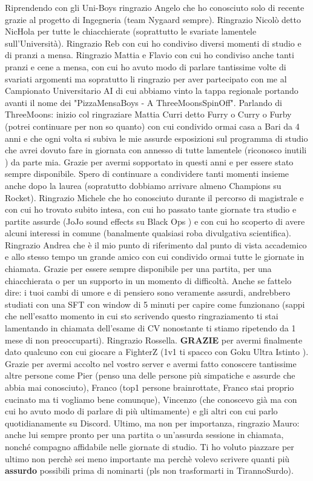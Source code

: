 Riprendendo con gli Uni-Boys ringrazio Angelo che ho conosciuto solo di recente grazie al progetto di Ingegneria (team Nygaard sempre). Ringrazio Nicolò detto NicHola per tutte le chiacchierate (soprattutto le svariate lamentele sull'Università). Ringrazio Reb con cui ho condiviso diversi momenti di studio e di pranzi a mensa. Ringrazio Mattia e Flavio con cui ho condiviso anche tanti pranzi e cene a mensa, con cui ho avuto modo di parlare tantissime volte di svariati argomenti ma sopratutto li ringrazio per aver partecipato con me al Campionato Universitario AI di cui abbiamo vinto la tappa regionale portando avanti il nome dei "PizzaMensaBoys - A ThreeMoonsSpinOff". Parlando di ThreeMoons: inizio col ringraziare Mattia Curri detto Furry o Curry o Furby (potrei continuare per non so quanto) con cui condivido ormai casa a Bari da 4 anni e che ogni volta si subiva le mie assurde esposizioni sul programma di studio che avrei dovuto fare in giornata con annesso di tutte lamentele (riconosco inutili ) da parte mia. Grazie per avermi sopportato in questi anni e per essere stato sempre disponibile. Spero di continuare a condividere tanti momenti insieme anche dopo la laurea (sopratutto dobbiamo arrivare almeno Champions su Rocket). Ringrazio Michele che ho conosciuto durante il percorso di magistrale e con cui ho trovato subito intesa, con cui ho passato tante giornate tra studio e partite assurde (JoJo sound effects su Black Ops ) e con cui ho scoperto di avere alcuni interessi in comune (banalmente qualsiasi roba divulgativa scientifica). Ringrazio Andrea che è il mio punto di riferimento dal punto di vista accademico e allo stesso tempo un grande amico con cui condivido ormai tutte le giornate in chiamata. Grazie per essere sempre disponibile per una partita, per una chiacchierata o per un supporto in un momento di difficoltà. Anche se fattelo dire: i tuoi cambi di umore e di pensiero sono veramente assurdi, andrebbero studiati con una SFT con window di 5 minuti per capire come funzionano (sappi che nell'esatto momento in cui sto scrivendo questo ringraziamento ti stai lamentando in chiamata dell'esame di CV nonostante ti stiamo ripetendo da 1 mese di non preoccuparti). Ringrazio Rossella. \textbf{GRAZIE} per avermi finalmente dato qualcuno con cui giocare a FighterZ (1v1 ti spacco con Goku Ultra Istinto ). Grazie per avermi accolto nel vostro server e avermi fatto conoscere tantissime altre persone come Pier (penso una delle persone più simpatiche e assurde che abbia mai conosciuto), Franco (top1 persone brainrottate, Franco stai proprio cucinato ma ti vogliamo bene comunque), Vincenzo (che conoscevo già ma con cui ho avuto modo di parlare di più ultimamente) e gli altri con cui parlo quotidianamente su Discord. Ultimo, ma non per importanza, ringrazio Mauro: anche lui sempre pronto per una partita o un'assurda sessione in chiamata, nonché compagno affidabile nelle giornate di studio. Ti ho voluto piazzare per ultimo non perchè sei meno importante ma perchè volevo scrivere quanti più \textbf{assurdo} possibili prima di nominarti (pls non trasformarti in TirannoSurdo).

